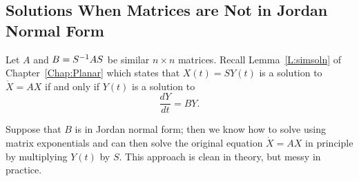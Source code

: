 \subsection*{Solutions When Matrices are Not in Jordan Normal Form} 

Let $A$ and $B=S^{-1} AS$ be similar $n\times n$ matrices.  Recall 
Lemma~\ref{L:simsoln} of Chapter~\ref{Chap:Planar} which states that 
$X(t)=SY(t)$ is a solution to $\dot{X}=AX$ if and only if $Y(t)$ is a 
solution to
\begin{equation} \label{E:JNFDE}
\frac{dY}{dt} = BY.
\end{equation}

Suppose that $B$ is in Jordan normal form; then we know how to solve 
 using matrix exponentials and can then solve the original
equation $\dot{X}=AX$ in principle by multiplying $Y(t)$ by $S$.  This 
approach is clean in theory, but messy in practice.  

